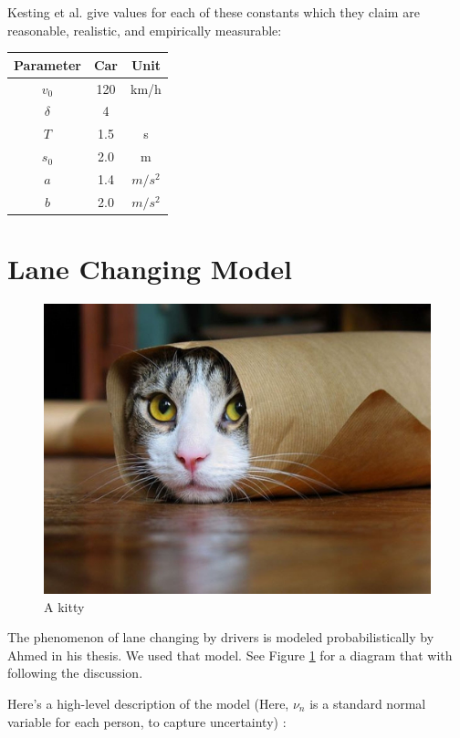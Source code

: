 Kesting et al. give values for each of these constants which they claim are reasonable, realistic, and empirically measurable:


\begin{tabular}{ccc}
\hline
Parameter & Car & Unit                  \\ \hline
$v_0$     & 120 & km/h                  \\
$\delta$   & 4   &                       \\
$T$        & 1.5 & s                     \\
$s_0$     & 2.0 & m                     \\
$a$        & 1.4 & $m/s^2$ \\
$b$        & 2.0 & $m/s^2$
\end{tabular}


\section{Lane Changing Model}

\begin{figure}
  \includegraphics[width=\linewidth]{kitty.jpg}
  \caption{A kitty}
  \label{fig:kitty1}
\end{figure}

The phenomenon of lane changing by drivers is modeled probabilistically by Ahmed in his thesis. We used that model. See Figure \ref{fig:kitty1} for a diagram that with following the discussion.



Here’s a high-level description of the model (Here, $\nu_n$ is a standard normal variable for each person, to capture uncertainty) :

